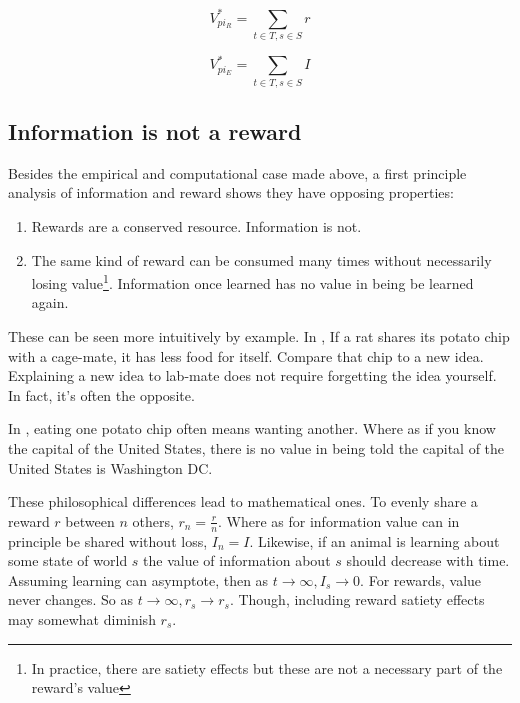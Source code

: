 \documentclass[9pt,twocolumn,twoside]{pnas-new}
\begin{document}
\begin{equation}
    V^{*}_{pi_R} = \sum_{t \in T, s \in S} r
    \label{eq:total_r_2}
\end{equation}

\begin{equation}
    V^{*}_{pi_E} = \sum_{t \in T, s \in S} I
    \label{eq:total_e}
\end{equation}

\subsection*{Information is not a reward}
Besides the empirical and computational case made above, a first principle analysis of information and reward shows they have opposing properties:

\begin{enumerate}
    \item Rewards are a conserved resource. Information is not. 
    \item The same kind of reward can be consumed many times without necessarily losing value\footnote{In practice, there are satiety effects but these are not a necessary part of the reward's value}. Information once learned has no value in being be learned again.
\end{enumerate}

These can be seen more intuitively by example. In , If a rat shares its potato chip with a cage-mate, it has less food for itself. Compare that chip to a new idea. Explaining a new idea to lab-mate does not require forgetting the idea yourself. In fact, it's often the opposite.

In , eating one potato chip often means wanting another. Where as if you know the capital of the United States, there is no value in being told the capital of the United States is Washington DC.

These philosophical differences lead to mathematical ones. To evenly share a reward $r$ between $n$ others, $r_n = \frac{r}{n}$. Where as for information value can in principle be shared without loss, $I_n = I$. Likewise, if an animal is learning about some state of world $s$ the value of information about $s$ should decrease with time. Assuming learning can asymptote, then as $t \rightarrow \infty, I_s \rightarrow 0$. For rewards, value never changes. So as $t \rightarrow \infty, r_s \rightarrow r_s$. Though, including reward satiety effects may somewhat diminish $r_s$.
\end{document}

